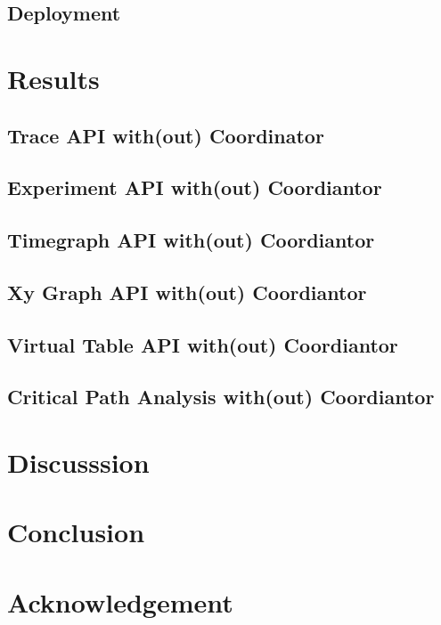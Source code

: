 \subsection{Deployment}

\section{Results}

\subsection{Trace API with(out) Coordinator}

\subsection{Experiment API with(out) Coordiantor}

\subsection{Timegraph API with(out) Coordiantor}

\subsection{Xy Graph API with(out) Coordiantor}

\subsection{Virtual Table API with(out) Coordiantor}

\subsection{Critical Path Analysis with(out) Coordiantor}

\section{Discusssion}

\section{Conclusion}

\section{Acknowledgement}